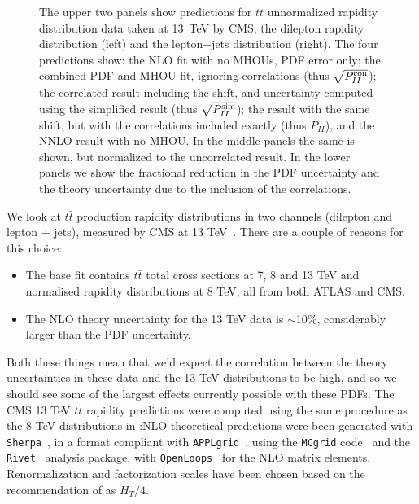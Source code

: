 \begin{figure}[H]
  \caption{The upper two panels show predictions for $t\bar{t}$ unnormalized rapidity distribution data taken at 13~TeV by CMS, the dilepton rapidity distribution \cite{Sirunyan:2018ucr} (left) and the lepton+jets distribution \cite{Sirunyan:2018wem} (right). The four predictions show: the NLO fit with no MHOUs, PDF error only; the combined PDF and MHOU fit, ignoring correlations (thus $\sqrt{P_{II}^{\rm con}}$); the correlated result including the shift, and uncertainty computed using the simplified result (thus $\sqrt{P_{II}^{\rm sim}}$); the result with the same shift, but with the correlations included exactly (thus $P_{II}$), and the NNLO result with no MHOU. In the middle panels the same is shown, but normalized to the uncorrelated result. In the lower panels we show the fractional reduction in the PDF uncertainty and the theory uncertainty due to the inclusion of the correlations.}
  \label{fig:CMSttbar}
\end{figure}

We look at $t\bar{t}$ production rapidity distributions in two channels (dilepton and lepton + jets), measured by CMS at 13 TeV~\cite{Sirunyan:2018ucr,Sirunyan:2018wem}. There are a couple of reasons for this choice:
\begin{itemize}
\item The base fit contains $t\bar{t}$ total cross sections at 7, 8 and 13 TeV and normalised rapidity distributions at 8 TeV, all from both ATLAS and CMS.
\item The NLO theory uncertainty for the 13 TeV data is $\sim$10\%, considerably larger than the PDF uncertainty.
\end{itemize}
Both these things mean that we'd expect the correlation between the theory uncertainties in these data and the 13 TeV distributions to be high, and so we should see some of the largest effects currently possible with these PDFs. The CMS 13 TeV $t\bar{t}$ rapidity predictions were computed using the same procedure as the 8 TeV distributions in \cite{Ball:2017nwa}:NLO theoretical predictions were been generated with {\tt Sherpa}~\cite{Gleisberg:2008ta}, in a format compliant with {\tt APPLgrid}~\cite{Carli:2010rw}, using the {\tt MCgrid} 
code~\cite{DelDebbio:2013kxa} and the {\tt Rivet}~\cite{Buckley:2010ar} analysis package, with {\tt OpenLoops}~\cite{Cascioli:2011va} for the NLO 
matrix elements. Renormalization and factorization scales have been chosen based on the recommendation of \cite{Czakon:2016dgf} as $H_T/4$.

